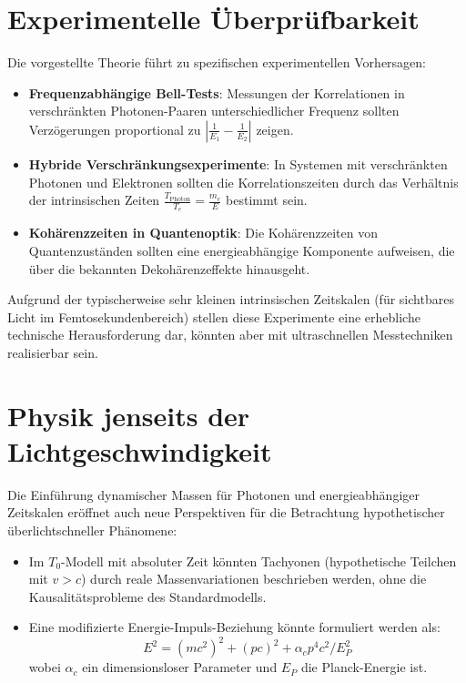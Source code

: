 \documentclass[a4paper,12pt]{article}
\begin{document}
	\section{Experimentelle Überprüfbarkeit}
	Die vorgestellte Theorie führt zu spezifischen experimentellen Vorhersagen:
	
	\begin{itemize}
		\item \textbf{Frequenzabhängige Bell-Tests}: Messungen der Korrelationen in verschränkten Photonen-Paaren unterschiedlicher Frequenz sollten Verzögerungen proportional zu $\left|\frac{1}{E_1} - \frac{1}{E_2}\right|$ zeigen.
		
		\item \textbf{Hybride Verschränkungsexperimente}: In Systemen mit verschränkten Photonen und Elektronen sollten die Korrelationszeiten durch das Verhältnis der intrinsischen Zeiten $\frac{T_{\text{Photon}}}{T_e} = \frac{m_e}{E}$ bestimmt sein.
		
		\item \textbf{Kohärenzzeiten in Quantenoptik}: Die Kohärenzzeiten von Quantenzuständen sollten eine energieabhängige Komponente aufweisen, die über die bekannten Dekohärenzeffekte hinausgeht.
	\end{itemize}
	
	Aufgrund der typischerweise sehr kleinen intrinsischen Zeitskalen (für sichtbares Licht im Femtosekundenbereich) stellen diese Experimente eine erhebliche technische Herausforderung dar, könnten aber mit ultraschnellen Messtechniken realisierbar sein.
	
	\section{Physik jenseits der Lichtgeschwindigkeit}
	Die Einführung dynamischer Massen für Photonen und energieabhängiger Zeitskalen eröffnet auch neue Perspektiven für die Betrachtung hypothetischer überlichtschneller Phänomene:
	
	\begin{itemize}
		\item Im $T_0$-Modell mit absoluter Zeit könnten Tachyonen (hypothetische Teilchen mit $v > c$) durch reale Massenvariationen beschrieben werden, ohne die Kausalitätsprobleme des Standardmodells.
		
		\item Eine modifizierte Energie-Impuls-Beziehung könnte formuliert werden als:
		\begin{equation}
			E^2 = (mc^2)^2 + (pc)^2 + \alpha_c p^4 c^2 / E_P^2
		\end{equation}
		wobei $\alpha_c$ ein dimensionsloser Parameter und $E_P$ die Planck-Energie ist.
	\end{itemize}
	
\end{document}
